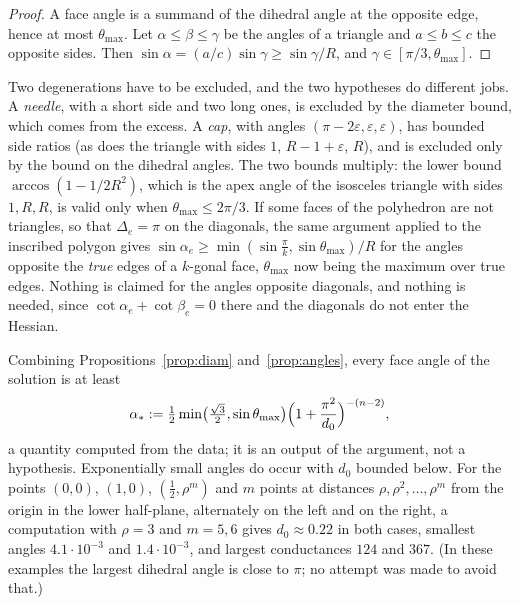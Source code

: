 \documentclass[11pt]{amsart}
\theoremstyle{definition}
\theoremstyle{remark}
\newcommand{\eps}{\varepsilon}
\begin{document}
\begin{proof}
A face angle is a summand of the dihedral angle at the opposite edge, hence at most $\theta_{\max}$. Let $\alpha\le\beta\le\gamma$ be the angles of a triangle and $a\le b\le c$ the opposite sides. Then $\sin\alpha=(a/c)\sin\gamma\ge\sin\gamma/R$, and $\gamma\in[\pi/3,\theta_{\max}]$.
\end{proof}

Two degenerations have to be excluded, and the two hypotheses do different jobs. A \emph{needle}, with a short side and two long ones, is excluded by the diameter bound, which comes from the excess. A \emph{cap}, with angles $(\pi-2\eps,\eps,\eps)$, has bounded side ratios (as does the triangle with sides $1$, $R-1+\eps$, $R$), and is
excluded only by the bound on the dihedral angles. The two bounds multiply: the lower bound $\arccos(1-1/2R^2)$, which is the apex angle of the isosceles triangle with sides $1,R,R$, is valid only when $\theta_{\max}\le2\pi/3$.
If some faces of the polyhedron are not triangles, so that $\Delta_e=\pi$ on the diagonals, the same argument applied to the inscribed polygon gives $\sin\alpha_e\ge\min(\sin\frac\pi k,\sin\theta_{\max})/R$ for the angles opposite the \emph{true} edges of a $k$-gonal face, $\theta_{\max}$ now being the maximum over true edges.
Nothing is claimed for the angles opposite diagonals, and nothing is needed, since $\cot\alpha_e+\cot\beta_e=0$ there and the diagonals do not enter the Hessian.

Combining Propositions~\ref{prop:diam} and~\ref{prop:angles}, every face angle of the solution is at least
\begin{equation}\label{eq:alphastar}
\alpha_*:=\tfrac12\min\bigl(\tfrac{\sqrt3}2,\sin\theta_{\max}\bigr)\Bigl(1+\frac{\pi^2}{d_0}\Bigr)^{-(n-2)},
\end{equation}
a quantity computed from the data; it is an output of the argument, not a hypothesis. Exponentially small angles do occur with $d_0$ bounded below. For the points $(0,0)$, $(1,0)$, $(\frac12,\rho^m)$ and $m$ points at distances $\rho,\rho^2,\dots,\rho^m$ from the origin in the lower half-plane, alternately on the left and on the right,
a computation with $\rho=3$ and $m=5,6$ gives $d_0\approx0.22$ in both cases, smallest angles $4.1\cdot10^{-3}$ and $1.4\cdot10^{-3}$, and largest conductances $124$ and $367$. (In these examples the largest dihedral angle is close to $\pi$; no attempt was made to avoid that.)
\end{document}

